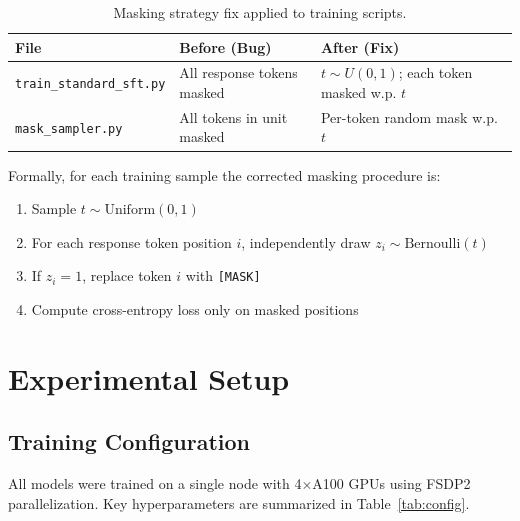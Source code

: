 \documentclass[11pt,a4paper]{article}
\begin{document}
\begin{table}[h]
\centering
\caption{Masking strategy fix applied to training scripts.}
\label{tab:fix}
\begin{tabular}{lll}
\toprule
\textbf{File} & \textbf{Before (Bug)} & \textbf{After (Fix)} \\
\midrule
\texttt{train\_standard\_sft.py} & All response tokens masked & $t \sim U(0,1)$; each token masked w.p. $t$ \\
\texttt{mask\_sampler.py} & All tokens in unit masked & Per-token random mask w.p. $t$ \\
\bottomrule
\end{tabular}
\end{table}

Formally, for each training sample the corrected masking procedure is:
\begin{enumerate}
  \item Sample $t \sim \text{Uniform}(0,1)$
  \item For each response token position $i$, independently draw $z_i \sim \text{Bernoulli}(t)$
  \item If $z_i = 1$, replace token $i$ with \texttt{[MASK]}
  \item Compute cross-entropy loss only on masked positions
\end{enumerate}

\section{Experimental Setup}

\subsection{Training Configuration}

All models were trained on a single node with 4$\times$A100 GPUs using FSDP2 parallelization. Key hyperparameters are summarized in Table~\ref{tab:config}.
\end{document}
